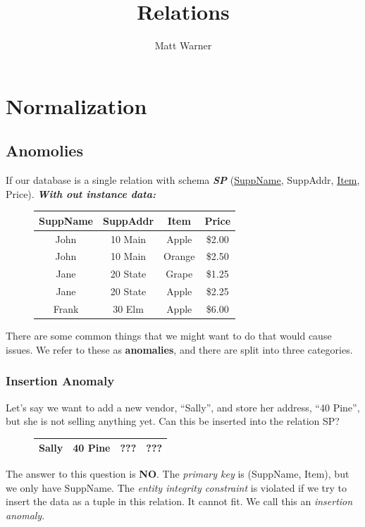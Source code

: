 \documentclass{report}
\title{\Huge{Relations}}
\author{\huge{Matt Warner}}
\date{\huge{}}
\begin{document}
    \maketitle
    \tableofcontents
    \newpage
    \chapter{Normalization}
    \newpage
    \section{Anomolies}
    If our database is a single relation with schema \textit{\textbf{SP}} (\underline{SuppName}, SuppAddr, \underline{Item}, Price).
    \bigbreak \noindent
    \textit{\textbf{With out instance data:}}
    \begin{figure}[H]
    \centering
    \setlength{\tabcolsep}{30}
    \begin{tabular}{c c c c}
        \hline
        SuppName & SuppAddr & Item & Price \\
        \hline
        John & 10 Main & Apple & \$2.00 \\
        \hline
        John & 10 Main & Orange & \$2.50 \\
        \hline
        Jane & 20 State & Grape & \$1.25 \\
        \hline
        Jane & 20 State & Apple & \$2.25 \\
        \hline
        Frank & 30 Elm & Apple & \$6.00  \\
        \hline
    \end{tabular}
    \end{figure}
    \bigbreak \noindent
    There are some common things that we might want to do that would cause issues. We refer to these as \textbf{anomalies}, and there are split into three categories.
    \subsection*{Insertion Anomaly}
    Let's say we want to add a new vendor, ``Sally'', and store her address, ``40 Pine'', but she is not selling anything yet. Can this be inserted into the relation SP?
    \begin{figure}[H]
    \centering
    \setlength{\tabcolsep}{39}
    \begin{tabular}{c c c c}
        \hline
        Sally & 40 Pine & ???  & ??? \\
        \hline
    \end{tabular}
    \end{figure}
    \bigbreak\noindent The answer to this question is \textbf{NO}. The \textit{primary key} is (SuppName, Item), but we only have SuppName. The \textit{entity integrity constraint} is violated if we try to insert the data as a tuple in this relation. It cannot fit. We call this an \textit{insertion anomaly}.
\end{document}
